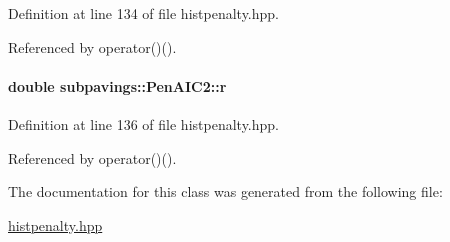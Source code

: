 \-Definition at line 134 of file histpenalty.\-hpp.



\-Referenced by operator()().

\hypertarget{classsubpavings_1_1PenAIC2_a1be98678a0fc1e824698714fbdc4b679}{
\paragraph[{r}]{\setlength{\rightskip}{0pt plus 5cm}double {\bf subpavings\-::\-Pen\-A\-I\-C2\-::r}}}\label{classsubpavings_1_1PenAIC2_a1be98678a0fc1e824698714fbdc4b679}


\-Definition at line 136 of file histpenalty.\-hpp.



\-Referenced by operator()().



\-The documentation for this class was generated from the following file\-:\begin{DoxyCompactItemize}
\item 
\hyperlink{histpenalty_8hpp}{histpenalty.\-hpp}\end{DoxyCompactItemize}
